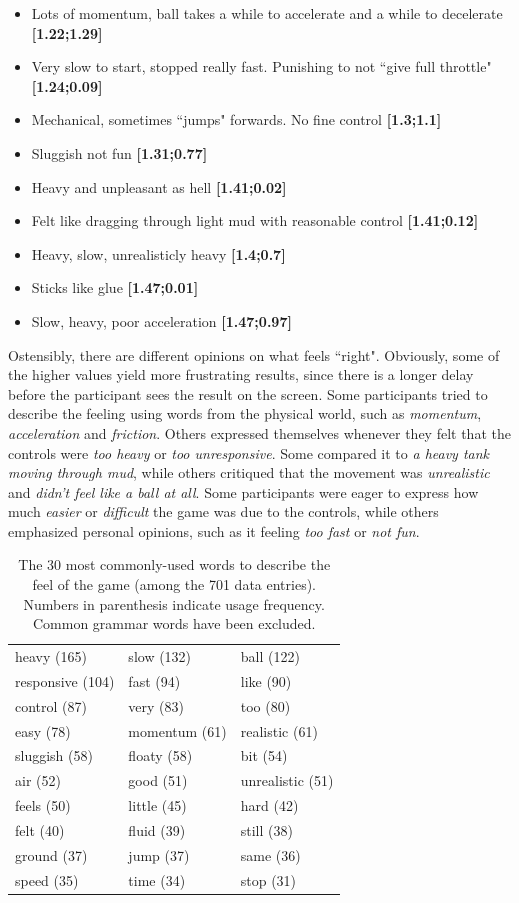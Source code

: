 \begin{itemize}[noitemsep,nolistsep]
\item Lots of momentum, ball takes a while to accelerate and a while to decelerate \textbf{[1.22;1.29]}
\item Very slow to start, stopped really fast. Punishing to not ``give full throttle" \textbf{[1.24;0.09]}
\item Mechanical, sometimes ``jumps" forwards. No fine control \textbf{[1.3;1.1]}
\item Sluggish not fun \textbf{[1.31;0.77]}
\item Heavy and unpleasant as hell \textbf{[1.41;0.02]}
\item Felt like dragging through light mud with reasonable control \textbf{[1.41;0.12]}
\item Heavy, slow, unrealisticly heavy \textbf{[1.4;0.7]}
\item Sticks like glue \textbf{[1.47;0.01]}
\item Slow, heavy, poor acceleration \textbf{[1.47;0.97]}
\end{itemize}

Ostensibly, there are different opinions on what feels ``right". Obviously, some of the higher values yield more frustrating results, since there is a longer delay before the participant sees the result on the screen. Some participants tried to describe the feeling using words from the physical world, such as \textit{momentum}, \textit{acceleration} and \textit{friction}. Others expressed themselves whenever they felt that the controls were \textit{too heavy} or \textit{too unresponsive}. Some compared it to \textit{a heavy tank moving through mud}, while others critiqued that the movement was \textit{unrealistic} and \textit{didn't feel like a ball at all}. Some participants were eager to express how much \textit{easier} or \textit{difficult} the game was due to the controls, while others emphasized personal opinions, such as it feeling \textit{too fast} or \textit{not fun}.

\begin{table} \centering
\caption{The 30 most commonly-used words to describe the feel of the game (among the 701 data entries). Numbers in parenthesis indicate usage frequency. Common grammar words have been excluded.}
\label{table:mostWords}
\begin{tabular}{lll}
\toprule
heavy (165) & slow (132) & ball (122)\\
responsive (104) & fast (94) & like (90)\\
control (87) & very (83) & too (80)\\ 
easy (78) & momentum (61) & realistic (61)\\
sluggish (58) & floaty (58) & bit (54)\\
air  (52) & good (51) & unrealistic (51)\\
feels (50) & little (45) & hard (42)\\
felt (40) & fluid (39) & still (38)\\
ground (37) & jump (37) & same (36)\\
speed (35) & time (34) & stop (31)\\
\bottomrule
\end{tabular}
\end{table}

